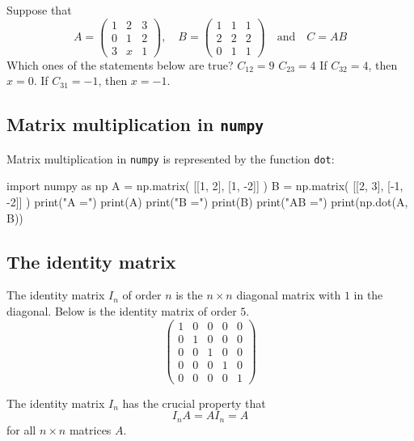 \documentclass{article}
\begin{document}
\begin{quizexercise}[showhide]
\begin{quiz}
\question
Suppose that
$$
A = 
\begin{pmatrix}
1 & 2 & 3\\
0 & 1 & 2\\
3 & x & 1
\end{pmatrix},
\quad
B = 
\begin{pmatrix}
1& 1 & 1\\
2 & 2 & 2\\
0 & 1 & 1
\end{pmatrix}\quad\text{and}\quad
C = A B
$$
Which ones of the statements below are true?
$C_{12} = 9$
$C_{23} = 4$
If $C_{32} = 4$, then $x = 0$.
If $C_{31} = -1$, then $x=-1$.
\end{quiz}
\end{quizexercise}

\subsection{Matrix multiplication in \texttt{numpy}}

Matrix multiplication in \texttt{numpy} is represented by the function \texttt{dot}:

\begin{sage}
import numpy as np
A = np.matrix( [[1, 2], [1, -2]] )
B = np.matrix( [[2, 3], [-1, -2]] )
print("A =")
print(A)
print("B =")
print(B)
print("AB =")
print(np.dot(A, B))
\end{sage}

\subsection{The identity matrix}


The identity matrix $I_n$ of order $n$ is the $n\times n$ diagonal matrix with $1$
in the diagonal. Below is the identity matrix of order $5$.
$$
\begin{pmatrix}
1 & 0 & 0 & 0 & 0\\
0 & 1 & 0 & 0 & 0\\
0 & 0 & 1 & 0 & 0\\
0 & 0 & 0 & 1 & 0\\
0 & 0 & 0 & 0 & 1
\end{pmatrix}
$$

The identity matrix $I_n$ has the crucial property that 
\begin{equation}\label{idmathident}
I_n A = A I_n = A
\end{equation}
for all $n\times n$ matrices $A$.
\end{document}
